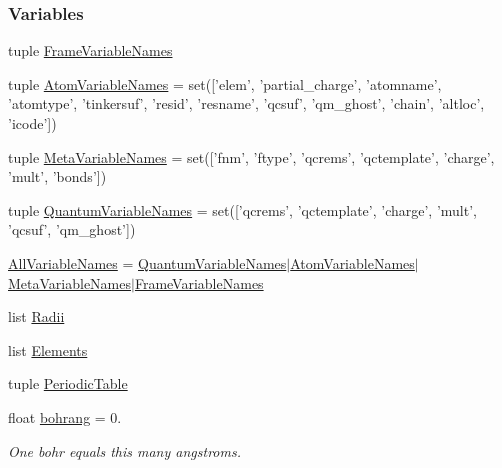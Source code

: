 \subsubsection*{\-Variables}
\begin{DoxyCompactItemize}
\item 
tuple \hyperlink{namespaceforcebalance_1_1molecule_a03da3fd451a69301311b20f00e409f3a}{\-Frame\-Variable\-Names}
\item 
tuple \hyperlink{namespaceforcebalance_1_1molecule_aa5faa35f222a5e9f4dae2648f0e41b73}{\-Atom\-Variable\-Names} = set(\mbox{[}'elem', 'partial\-\_\-charge', 'atomname', 'atomtype', 'tinkersuf', 'resid', 'resname', 'qcsuf', 'qm\-\_\-ghost', 'chain', 'altloc', 'icode'\mbox{]})
\item 
tuple \hyperlink{namespaceforcebalance_1_1molecule_a576677e3e9a7d9d1aac5523aaf9098c1}{\-Meta\-Variable\-Names} = set(\mbox{[}'fnm', 'ftype', 'qcrems', 'qctemplate', 'charge', 'mult', 'bonds'\mbox{]})
\item 
tuple \hyperlink{namespaceforcebalance_1_1molecule_a483603baba28d76694b2d5f1e7b37813}{\-Quantum\-Variable\-Names} = set(\mbox{[}'qcrems', 'qctemplate', 'charge', 'mult', 'qcsuf', 'qm\-\_\-ghost'\mbox{]})
\item 
\hyperlink{namespaceforcebalance_1_1molecule_ab103b4aacb65cce6b558135c39a6e9a4}{\-All\-Variable\-Names} = \hyperlink{namespaceforcebalance_1_1molecule_a483603baba28d76694b2d5f1e7b37813}{\-Quantum\-Variable\-Names}$|$\hyperlink{namespaceforcebalance_1_1molecule_aa5faa35f222a5e9f4dae2648f0e41b73}{\-Atom\-Variable\-Names}$|$\hyperlink{namespaceforcebalance_1_1molecule_a576677e3e9a7d9d1aac5523aaf9098c1}{\-Meta\-Variable\-Names}$|$\hyperlink{namespaceforcebalance_1_1molecule_a03da3fd451a69301311b20f00e409f3a}{\-Frame\-Variable\-Names}
\item 
list \hyperlink{namespaceforcebalance_1_1molecule_ae100906fa209012ddf9d4b19ee69b0b7}{\-Radii}
\item 
list \hyperlink{namespaceforcebalance_1_1molecule_af1987e9e7f33b828c15f1e4f7dcded2c}{\-Elements}
\item 
tuple \hyperlink{namespaceforcebalance_1_1molecule_a00baf2798fd1a1e41c0364e94eafd133}{\-Periodic\-Table}
\item 
float \hyperlink{namespaceforcebalance_1_1molecule_af69f9f12bed5faede1948498e9f0d2e5}{bohrang} = 0.
\begin{DoxyCompactList}\small\item\em \-One bohr equals this many angstroms. \end{DoxyCompactList}\item 

\end{DoxyCompactItemize}
